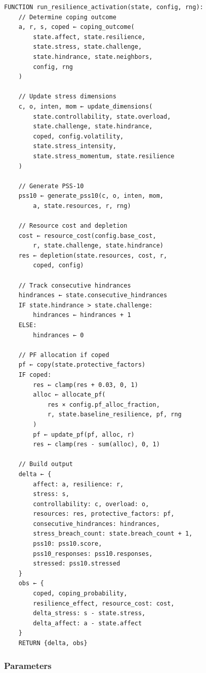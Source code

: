\documentclass[
  letterpaper,
  DIV=11,
  numbers=noendperiod]{scrartcl}
\begin{document}
\begin{verbatim}
FUNCTION run_resilience_activation(state, config, rng):
    // Determine coping outcome
    a, r, s, coped ← coping_outcome(
        state.affect, state.resilience,
        state.stress, state.challenge,
        state.hindrance, state.neighbors,
        config, rng
    )

    // Update stress dimensions
    c, o, inten, mom ← update_dimensions(
        state.controllability, state.overload,
        state.challenge, state.hindrance,
        coped, config.volatility,
        state.stress_intensity,
        state.stress_momentum, state.resilience
    )

    // Generate PSS-10
    pss10 ← generate_pss10(c, o, inten, mom,
        a, state.resources, r, rng)

    // Resource cost and depletion
    cost ← resource_cost(config.base_cost,
        r, state.challenge, state.hindrance)
    res ← depletion(state.resources, cost, r,
        coped, config)

    // Track consecutive hindrances
    hindrances ← state.consecutive_hindrances
    IF state.hindrance > state.challenge:
        hindrances ← hindrances + 1
    ELSE:
        hindrances ← 0

    // PF allocation if coped
    pf ← copy(state.protective_factors)
    IF coped:
        res ← clamp(res + 0.03, 0, 1)
        alloc ← allocate_pf(
            res × config.pf_alloc_fraction,
            r, state.baseline_resilience, pf, rng
        )
        pf ← update_pf(pf, alloc, r)
        res ← clamp(res - sum(alloc), 0, 1)

    // Build output
    delta ← {
        affect: a, resilience: r,
        stress: s,
        controllability: c, overload: o,
        resources: res, protective_factors: pf,
        consecutive_hindrances: hindrances,
        stress_breach_count: state.breach_count + 1,
        pss10: pss10.score,
        pss10_responses: pss10.responses,
        stressed: pss10.stressed
    }
    obs ← {
        coped, coping_probability,
        resilience_effect, resource_cost: cost,
        delta_stress: s - state.stress,
        delta_affect: a - state.affect
    }
    RETURN {delta, obs}
\end{verbatim}

\subsubsection{Parameters}\label{parameters-2}
\end{document}
